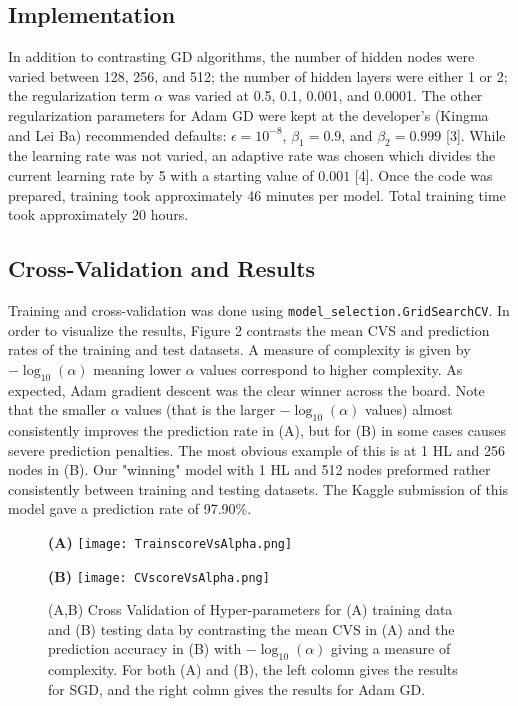 \documentclass{article}
\begin{document}
\subsection{Implementation}
In addition to contrasting GD algorithms, the number of hidden nodes were varied between 128, 256, and 512; the number of hidden layers were either 1 or 2; the regularization term $\alpha$ was varied at 0.5, 0.1, 0.001, and 0.0001. The other regularization parameters for Adam GD were kept at the developer's (Kingma and Lei Ba) recommended defaults: $\epsilon = 10^{-8}$, $\beta_1=0.9$, and $\beta_2=0.999$ [3]. While the learning rate was not varied, an adaptive rate was chosen which divides the current learning rate by 5 with a starting value of $0.001$ [4]. Once the code was prepared, training took approximately 46 minutes per model. Total training time took approximately 20 hours.

\subsection{Cross-Validation and Results}
Training and cross-validation was done using \verb+model_selection.GridSearchCV+. In order to visualize the results, Figure 2 contrasts the mean CVS and prediction rates of the training and test datasets. A measure of complexity is given by $-\log_{10}(\alpha)$ meaning lower $\alpha$ values correspond to higher complexity. As expected, Adam gradient descent was the clear winner across the board. Note that the smaller $\alpha$ values (that is the larger $-\log_{10}(\alpha)$ values) almost consistently improves the prediction rate in (A), but for (B) in some cases causes severe prediction penalties. The most obvious example of this is at 1 HL and 256 nodes in (B). Our "winning" model with 1 HL and 512 nodes preformed rather consistently between training and testing datasets. The Kaggle submission of this model gave a prediction rate of 97.90\%.

\begin{figure}[h]
    \centering
    \begin{minipage}[t]{0.45\textwidth}
        \centering
        \textbf{(A)}
        \texttt{[image: TrainscoreVsAlpha.png]}
    \end{minipage}
    \begin{minipage}[t]{0.45\textwidth}
        \centering
        \textbf{(B)}
        \texttt{[image: CVscoreVsAlpha.png]}
    \end{minipage}
\caption{(A,B) Cross Validation of Hyper-parameters for (A) training data and (B) testing data by contrasting the mean CVS in (A) and the prediction accuracy in (B) with $-\log_{10}(\alpha)$ giving a measure of complexity. For both (A) and (B), the left colomn gives the results for SGD, and the right colmn gives the results for Adam GD.}
\end{figure}
\end{document}

